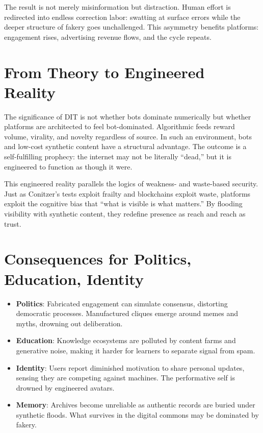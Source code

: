 \documentclass[openany]{book}
\begin{document}
The result is not merely misinformation but distraction. Human effort is redirected into endless correction labor: swatting at surface errors while the deeper structure of fakery goes unchallenged. This asymmetry benefits platforms: engagement rises, advertising revenue flows, and the cycle repeats.

\section{From Theory to Engineered Reality}

The significance of DIT is not whether bots dominate numerically but whether platforms are architected to feel bot-dominated. Algorithmic feeds reward volume, virality, and novelty regardless of source. In such an environment, bots and low-cost synthetic content have a structural advantage. The outcome is a self-fulfilling prophecy: the internet may not be literally ``dead,'' but it is engineered to function as though it were.

This engineered reality parallels the logics of weakness- and waste-based security. Just as Conitzer’s tests exploit frailty and blockchains exploit waste, platforms exploit the cognitive bias that ``what is visible is what matters.'' By flooding visibility with synthetic content, they redefine presence as reach and reach as trust.

\section{Consequences for Politics, Education, Identity}

\begin{itemize}
    \item \textbf{Politics}: Fabricated engagement can simulate consensus, distorting democratic processes. Manufactured cliques emerge around memes and myths, drowning out deliberation.
    \item \textbf{Education}: Knowledge ecosystems are polluted by content farms and generative noise, making it harder for learners to separate signal from spam.
    \item \textbf{Identity}: Users report diminished motivation to share personal updates, sensing they are competing against machines. The performative self is drowned by engineered avatars.
    \item \textbf{Memory}: Archives become unreliable as authentic records are buried under synthetic floods. What survives in the digital commons may be dominated by fakery.
\end{itemize}
\end{document}
